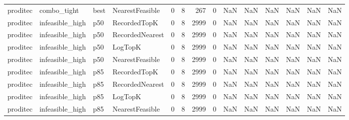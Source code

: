 \begin{tabular}{llllrrrrrrrrrr}
proditec &          combo\_tight &   best & NearestFeasible &           0 &          8 &            267 &                   0 &            NaN &             NaN &                       NaN &            NaN &                    NaN &                     NaN \\
proditec &      infeasible\_high &    p50 &    RecordedTopK &           0 &          8 &           2999 &                   0 &            NaN &             NaN &                       NaN &            NaN &                    NaN &                     NaN \\
proditec &      infeasible\_high &    p50 & RecordedNearest &           0 &          8 &           2999 &                   0 &            NaN &             NaN &                       NaN &            NaN &                    NaN &                     NaN \\
proditec &      infeasible\_high &    p50 &         LogTopK &           0 &          8 &           2999 &                   0 &            NaN &             NaN &                       NaN &            NaN &                    NaN &                     NaN \\
proditec &      infeasible\_high &    p50 & NearestFeasible &           0 &          8 &           2999 &                   0 &            NaN &             NaN &                       NaN &            NaN &                    NaN &                     NaN \\
proditec &      infeasible\_high &    p85 &    RecordedTopK &           0 &          8 &           2999 &                   0 &            NaN &             NaN &                       NaN &            NaN &                    NaN &                     NaN \\
proditec &      infeasible\_high &    p85 & RecordedNearest &           0 &          8 &           2999 &                   0 &            NaN &             NaN &                       NaN &            NaN &                    NaN &                     NaN \\
proditec &      infeasible\_high &    p85 &         LogTopK &           0 &          8 &           2999 &                   0 &            NaN &             NaN &                       NaN &            NaN &                    NaN &                     NaN \\
proditec &      infeasible\_high &    p85 & NearestFeasible &           0 &          8 &           2999 &                   0 &            NaN &             NaN &                       NaN &            NaN &                    NaN &                     NaN \\

\end{tabular}
